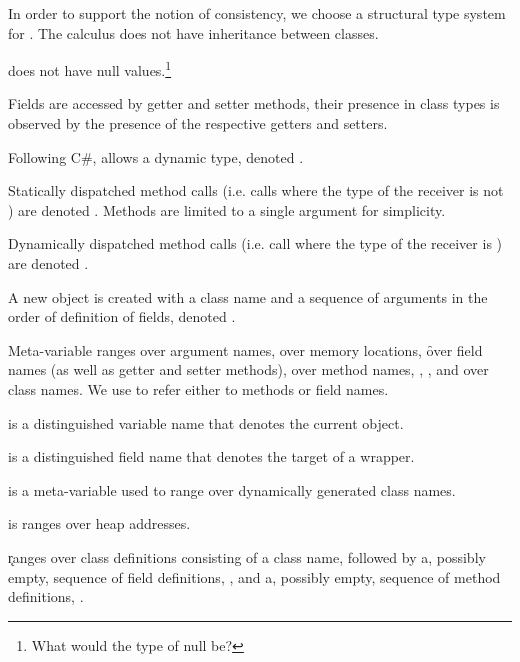 \documentclass[a4paper,USenglish]{tex/lipics-v2016}
\begin{document}
In order to support the notion of consistency, we choose a structural type
system for \kafka.  The calculus does not have inheritance between classes.

\kafka does not have null values.\footnote{What would the type of null be?}

Fields are accessed by getter and setter methods, their presence in class
types is observed by the presence of the respective getters and setters.


Following C\#, \kafka allows a dynamic type, denoted \any. 

Statically dispatched method calls (i.e. calls where the type of the
receiver is not \any) are denoted \Call\x\m\e. Methods are limited to a
single argument for simplicity.

Dynamically dispatched method calls (i.e. call where the type of the receiver
is \any) are denoted \DynCall\x\m\e.

A new object is created with a class name and a sequence of arguments in the
order of definition of fields, denoted \New\C{\b\e}.

Meta-variable \x ranges over argument names, \a over memory locations, \f
over field names (as well as getter and setter methods), \m over method
names, \C, \D, and \E over class names.  We use \n to refer either to
methods or field names.

\this is a distinguished variable name that denotes the current object.

\that is a distinguished field name that denotes the target of a wrapper.

\D is a meta-variable used to range over dynamically generated class names.

\a is ranges over heap addresses.

\k ranges over class definitions consisting of a class name, followed by
a, possibly empty, sequence of field definitions, \fd, and a, possibly empty,
sequence of method definitions, \md.
\end{document}
